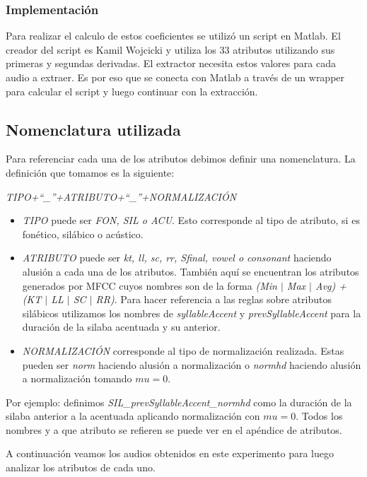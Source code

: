 \subsubsection{Implementación}

Para realizar el calculo de estos coeficientes se utilizó un script en Matlab. El creador del script es Kamil Wojcicki y utiliza los 33 atributos utilizando sus primeras y segundas derivadas. El extractor necesita estos valores para cada audio a extraer. Es por eso que se conecta con Matlab a través de un wrapper para calcular el script y luego continuar con la extracción.

\subsection{Nomenclatura utilizada}
Para referenciar cada una de los atributos debimos definir una nomenclatura. La definición que tomamos es la siguiente:
\begin{center}
\textit{TIPO+``\_''+ATRIBUTO+``\_''+NORMALIZACIÓN} 
\end{center}

\begin{itemize}
  \item \emph{TIPO} puede ser \emph{FON, SIL o ACU}. Esto corresponde al tipo de atributo, si es fonético, silábico o acústico.
  \item \emph{ATRIBUTO} puede ser \emph{kt, ll, sc, rr, Sfinal, vowel o consonant} haciendo alusión a cada una de los atributos. También aquí se encuentran los atributos generados por MFCC cuyos nombres son de la forma \emph{(Min $|$ Max $|$ Avg) + (KT $|$ LL $|$ SC $|$ RR)}. Para hacer referencia a las reglas sobre atributos silábicos utilizamos los nombres de \emph{syllableAccent} y \emph{prevSyllableAccent} para la duración de la silaba acentuada y su anterior.
  \item \emph{NORMALIZACIÓN} corresponde al tipo de normalización realizada. Estas pueden ser \emph{norm} haciendo alusión a normalización o \emph{normhd} haciendo alusión a normalización tomando $mu=0$.
\end{itemize}
 
Por ejemplo: definimos \textit{SIL\_prevSyllableAccent\_normhd} como la duración de la silaba anterior a la acentuada aplicando normalización con $mu=0$. Todos los nombres y a que atributo se refieren se puede ver en el apéndice de atributos.

A continuación veamos los audios obtenidos en este experimento para luego analizar los atributos de cada uno.